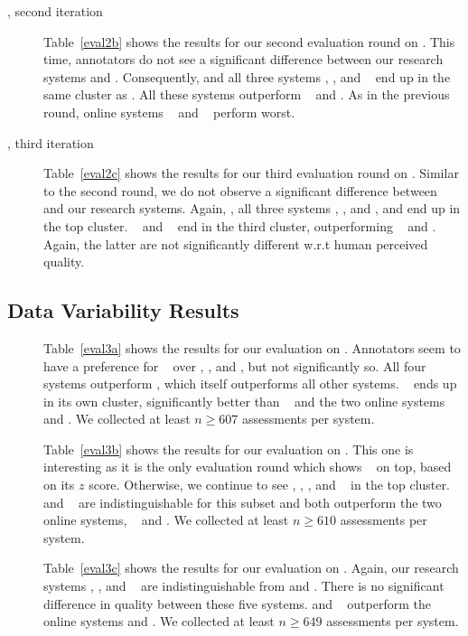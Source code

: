 \documentclass[a4paper]{article}
\begin{document}
\begin{CJK*}{UTF8}{gbsn}
\begin{description}
\item[\SubsetB, second iteration] Table~\ref{eval2b} shows the results for our second evaluation round on \SubsetB. This time, annotators do not see a significant difference between our research systems and \RefPE. Consequently, \RefHT and all three systems \ComboA, \ComboB, and \ComboC~ end up in the same cluster as \RefPE. All these systems outperform \Sogou~ and \RefWMT. As in the previous round, online systems \Microsoft~ and \Google~ perform worst.

\item[\SubsetB, third iteration] Table~\ref{eval2c} shows the results for our third evaluation round on \SubsetB. Similar to the second round, we do not observe a significant difference between \RefPE~ and our research systems. Again, \RefHT, all three systems \ComboA, \ComboB, and \ComboC, and \RefPE{} end up in the top cluster. \Sogou~ and \RefWMT~ end in the third cluster, outperforming \Microsoft~ and \Google. Again, the latter are not significantly different w.r.t human perceived quality.
\end{description}

\subsection{Data Variability Results}
\begin{description}
\item[\SubsetC] Table~\ref{eval3a} shows the results for our evaluation on \SubsetC. Annotators seem to have a preference for \RefHT~ over \ComboA, \ComboB, and \ComboC, but not significantly so. All four systems outperform \RefPE, which itself outperforms all other systems. \Sogou~ ends up in its own cluster, significantly better than \RefWMT~ and the two online systems \Microsoft~ and \Google. We collected at least $n \geq 607$ assessments per system.

\item[\SubsetD] Table~\ref{eval3b} shows the results for our evaluation on \SubsetD. This one is interesting as it is the only evaluation round which shows \RefPE~ on top, based on its $z$ score. Otherwise, we continue to see \RefHT, \ComboA, \ComboB, and \ComboC~ in the top cluster. \Sogou~ and \RefWMT~ are indistinguishable for this subset and both outperform the two online systems, \Microsoft~ and \Google. We collected at least $n \geq 610$ assessments per system. 

\item[\SubsetE] Table~\ref{eval3c} shows the results for our evaluation on \SubsetE. Again, our research systems \ComboA, \ComboB, and \ComboC~ are indistinguishable from \RefHT{} and \RefPE. There is no significant difference in quality between these five systems. \Sogou{} and \RefWMT~ outperform the online systems \Microsoft{} and \Google. We collected at least $n \geq 649$ assessments per system. 
\end{description}




\end{CJK*}
\end{document}
